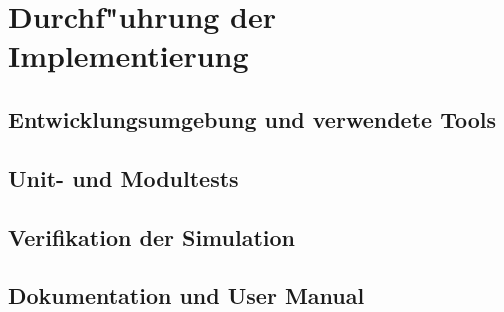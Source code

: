 \chapter{Durchf"uhrung der Implementierung}
\section{Entwicklungsumgebung und verwendete Tools}
\section{Unit- und Modultests}
\section{Verifikation der Simulation}
\section{Dokumentation und User Manual}